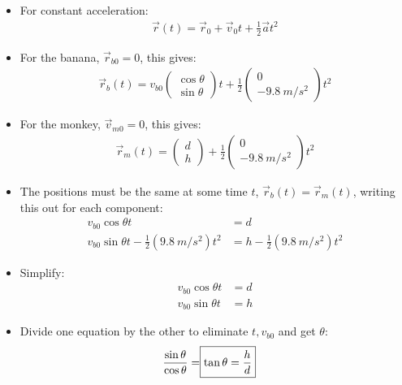 \documentclass[aspectratio=169,
hyperref={colorlinks,urlcolor=blue}
]{beamer}
\begin{document}
{\scriptsize
\begin{itemize}
\item For constant acceleration:
\begin{align*}
\vec r(t) = \vec r_0 + \vec v_0 t + \frac{1}{2} \vec a t^2
\end{align*}
\item<2-> For the banana, $\vec r_{b0}=0$, this gives:
\begin{align*}
\vec r_b (t) = v_{b0} \begin{pmatrix}
\cos\theta \\ \sin\theta
\end{pmatrix}
t+ \frac{1}{2} \begin{pmatrix}
0\\ \SI{-9.8}{m/s^2}
\end{pmatrix}t^2
\end{align*}
\item<3-> For the monkey, $\vec v_{m0}=0$, this gives:
\begin{align*}
\vec r_m (t) = \begin{pmatrix}
d \\ h
\end{pmatrix}
+ \frac{1}{2} \begin{pmatrix}
0\\ \SI{-9.8}{m/s^2}
\end{pmatrix}t^2
\end{align*}

\end{itemize}
}
{\scriptsize
\begin{itemize}
\item<4-> The positions must be the same at some time $t$, $\vec r_b (t)=\vec r_m (t)$, writing this out for each component:
\begin{align*}
v_{b0}\cos\theta t&= d\\
v_{b0}\sin\theta t-\frac{1}{2}(\SI{9.8}{m/s^2}) t^2&= h-\frac{1}{2}(\SI{9.8}{m/s^2})t^2
\end{align*}
\item<5-> Simplify:
\begin{align*}
v_{b0}\cos\theta t&= d\\
v_{b0}\sin\theta t&= h
\end{align*}
\item<6> Divide one equation by the other to eliminate $t, v_{b0}$ and get $\theta$:
\begin{align*}
\frac{\sin\theta}{\cos \theta}=\Aboxed{\tan\theta=\frac{h}{d}}
\end{align*}
\end{itemize}
}
\end{document}
